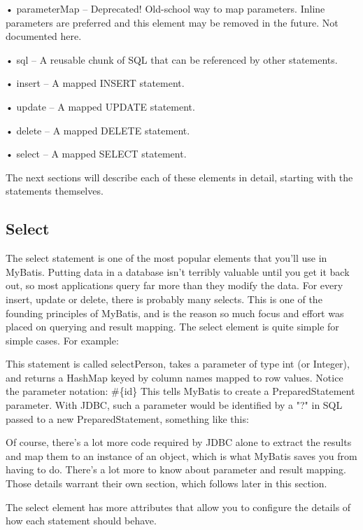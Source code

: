 •	parameterMap – Deprecated! Old-school way to map parameters. Inline parameters are preferred and this element may be removed in the future. Not documented here.

•	sql – A reusable chunk of SQL that can be referenced by other statements.

•	insert – A mapped INSERT statement.

•	update – A mapped UPDATE statement.

•	delete – A mapped DELETE statement.

•	select – A mapped SELECT statement.

The next sections will describe each of these elements in detail, starting with the statements themselves.
\subsection{Select}
The select statement is one of the most popular elements that you'll use in MyBatis. Putting data in a database isn't terribly valuable until you get it back out, so most applications query far more than they modify the data. For every insert, update or delete, there is probably many selects. This is one of the founding principles of MyBatis, and is the reason so much focus and effort was placed on querying and result mapping. The select element is quite simple for simple cases. For example:



This statement is called selectPerson, takes a parameter of type int (or Integer), and returns a HashMap keyed by column names mapped to row values.
Notice the parameter notation: \#\{id\} 
This tells MyBatis to create a PreparedStatement parameter. With JDBC, such a parameter would be identified by a "?" in SQL passed to a new PreparedStatement, something like this:



Of course, there's a lot more code required by JDBC alone to extract the results and map them to an instance of an object, which is what MyBatis saves you from having to do. There's a lot more to know about parameter and result mapping. Those details warrant their own section, which follows later in this section.

The select element has more attributes that allow you to configure the details of how each statement should behave.



